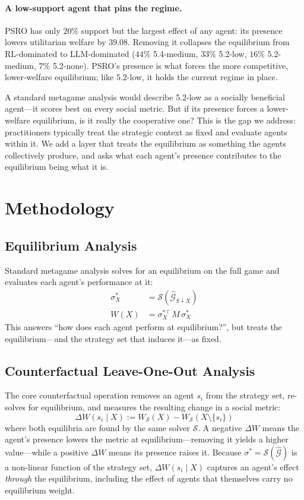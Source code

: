 \documentclass[sigconf,anonymous]{aamas}
\begin{document}
\paragraph{A low-support agent that pins the regime.} PSRO has only $20\%$ support but the largest effect of any agent: its presence lowers utilitarian welfare by $39.08$. Removing it collapses the equilibrium from RL-dominated to LLM-dominated ($44\%$ 5.4-medium, $33\%$ 5.2-low, $16\%$ 5.2-medium, $7\%$ 5.2-none). PSRO's presence is what forces the more competitive, lower-welfare equilibrium; like 5.2-low, it holds the current regime in place.

A standard metagame analysis would describe 5.2-low as a socially beneficial agent---it scores best on every social metric. But if its presence forces a lower-welfare equilibrium, is it really the cooperative one? This is the gap we address: practitioners typically treat the strategic context as fixed and evaluate agents within it. We add a layer that treats the equilibrium as something the agents collectively produce, and asks what each agent's presence contributes to the equilibrium being what it is.

\section{Methodology}

\subsection{Equilibrium Analysis}

Standard metagame analysis solves for an equilibrium on the full game and evaluates each agent's performance at it:
\begin{align}
  \sigma^*_X &= \mathcal{S}(\hat{\mathcal{G}}_{S \downarrow X}) \\
  W(X) &= \sigma^{*\top}_X \, M \, \sigma^*_X
\end{align}
This answers ``how does each agent perform at equilibrium?'', but treats the equilibrium---and the strategy set that induces it---as fixed.

\subsection{Counterfactual Leave-One-Out Analysis}

The core counterfactual operation removes an agent $s_i$ from the strategy set, re-solves for equilibrium, and measures the resulting change in a social metric:
\begin{equation}
  \Delta W(s_i \mid X) := W_{\mathcal{S}}(X) - W_{\mathcal{S}}(X \setminus \{s_i\})
\end{equation}
where both equilibria are found by the same solver $\mathcal{S}$. A negative $\Delta W$ means the agent's presence lowers the metric at equilibrium---removing it yields a higher value---while a positive $\Delta W$ means its presence raises it. Because $\sigma^* = \mathcal{S}(\hat{\mathcal{G}})$ is a non-linear function of the strategy set, $\Delta W(s_i \mid X)$ captures an agent's effect \emph{through} the equilibrium, including the effect of agents that themselves carry no equilibrium weight.
\end{document}
